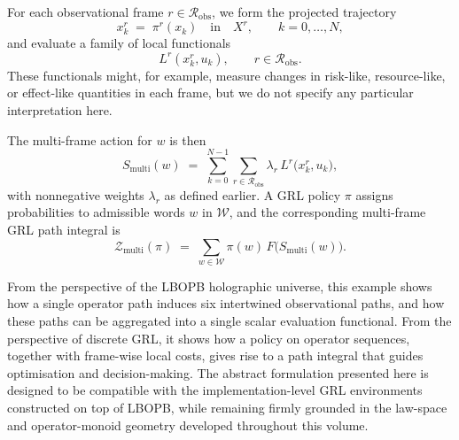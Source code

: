 \documentclass[11pt]{book}
\theoremstyle{plain}
\theoremstyle{definition}
\theoremstyle{remark}
\begin{document}
For each observational frame $r \in \mathcal{R}_{\mathrm{obs}}$, we
form the projected trajectory
\[
  x^{r}_{k} \;=\; \pi^{r}(x_{k})
  \quad\text{in}\quad X^{r},
  \qquad k = 0,\dots,N,
\]
and evaluate a family of local functionals
\[
  L^{r}(x^{r}_{k}, u_{k}),
  \qquad r \in \mathcal{R}_{\mathrm{obs}}.
\]
These functionals might, for example, measure changes in risk-like,
resource-like, or effect-like quantities in each frame, but we do not
specify any particular interpretation here.

The multi-frame action for $w$ is then
\[
  S_{\mathrm{multi}}(w)
  \;=\;
  \sum_{k=0}^{N-1}
  \sum_{r \in \mathcal{R}_{\mathrm{obs}}}
  \lambda_{r}\,
  L^{r}\bigl(x^{r}_{k}, u_{k}\bigr),
\]
with nonnegative weights $\lambda_{r}$ as defined earlier. A GRL
policy $\pi$ assigns probabilities to admissible words $w$ in
$\mathcal{W}$, and the corresponding multi-frame GRL path integral is
\[
  \mathcal{Z}_{\mathrm{multi}}(\pi)
  \;=\;
  \sum_{w \in \mathcal{W}} \pi(w)\,
  F\bigl(S_{\mathrm{multi}}(w)\bigr).
\]

From the perspective of the LBOPB holographic universe, this example
shows how a single operator path induces six intertwined observational
paths, and how these paths can be aggregated into a single scalar
evaluation functional. From the perspective of discrete GRL, it shows
how a policy on operator sequences, together with frame-wise local
costs, gives rise to a path integral that guides optimisation and
decision-making. The abstract formulation presented here is designed
to be compatible with the implementation-level GRL environments
constructed on top of LBOPB, while remaining firmly grounded in the
law-space and operator-monoid geometry developed throughout this
volume.
\end{document}
